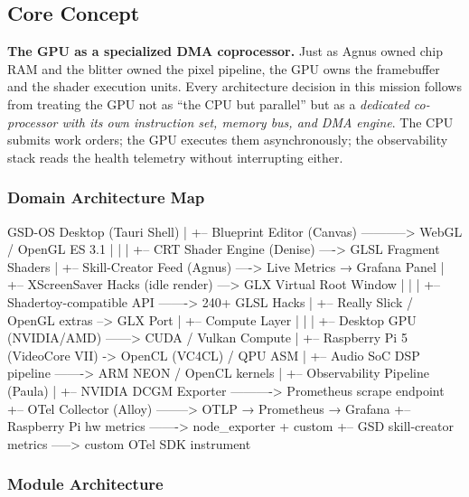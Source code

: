 \documentclass[11pt,letterpaper]{article}
\begin{document}
\subsection{Core Concept}

\textbf{The GPU as a specialized DMA coprocessor.} Just as Agnus owned chip RAM and the blitter owned the pixel pipeline, the GPU owns the framebuffer and the shader execution units. Every architecture decision in this mission follows from treating the GPU not as ``the CPU but parallel'' but as a \emph{dedicated co-processor with its own instruction set, memory bus, and DMA engine}. The CPU submits work orders; the GPU executes them asynchronously; the observability stack reads the health telemetry without interrupting either.

\subsubsection{Domain Architecture Map}

\begin{asciibox}
GSD-OS Desktop (Tauri Shell)
  |
  +-- Blueprint Editor (Canvas) -----------> WebGL / OpenGL ES 3.1
  |     |
  |     +-- CRT Shader Engine (Denise) ----> GLSL Fragment Shaders
  |     +-- Skill-Creator Feed (Agnus) ----> Live Metrics → Grafana Panel
  |
  +-- XScreenSaver Hacks (idle render) ---> GLX Virtual Root Window
  |     |
  |     +-- Shadertoy-compatible API -------> 240+ GLSL Hacks
  |     +-- Really Slick / OpenGL extras --> GLX Port
  |
  +-- Compute Layer
  |     |
  |     +-- Desktop GPU (NVIDIA/AMD) ------> CUDA / Vulkan Compute
  |     +-- Raspberry Pi 5 (VideoCore VII) -> OpenCL (VC4CL) / QPU ASM
  |     +-- Audio SoC DSP pipeline -------> ARM NEON / OpenCL kernels
  |
  +-- Observability Pipeline (Paula)
        |
        +-- NVIDIA DCGM Exporter ----------> Prometheus scrape endpoint
        +-- OTel Collector (Alloy) --------> OTLP → Prometheus → Grafana
        +-- Raspberry Pi hw metrics -------> node_exporter + custom
        +-- GSD skill-creator metrics -----> custom OTel SDK instrument
\end{asciibox}

\subsubsection{Module Architecture}
\end{document}
